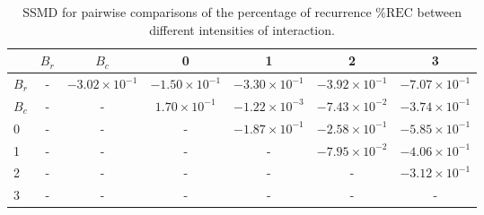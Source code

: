 \begin{table}
\centering
\caption{SSMD for pairwise comparisons of the percentage of recurrence $\%\text{REC}$ between different intensities of interaction.}
\label{tab:ssmd_rec}
\begin{tabular}{lcccccc}
\toprule
 & $B_r$ & $B_c$ & 0 & 1 & 2 & 3 \\
\midrule
$B_r$ & - & $-3.02 \times 10^{-1}$ & $-1.50 \times 10^{-1}$ & $-3.30 \times 10^{-1}$ & $-3.92 \times 10^{-1}$ & $-7.07 \times 10^{-1}$ \\
$B_c$ & - & - & $1.70 \times 10^{-1}$ & $-1.22 \times 10^{-3}$ & $-7.43 \times 10^{-2}$ & $-3.74 \times 10^{-1}$ \\
0 & - & - & - & $-1.87 \times 10^{-1}$ & $-2.58 \times 10^{-1}$ & $-5.85 \times 10^{-1}$ \\
1 & - & - & - & - & $-7.95 \times 10^{-2}$ & $-4.06 \times 10^{-1}$ \\
2 & - & - & - & - & - & $-3.12 \times 10^{-1}$ \\
3 & - & - & - & - & - & - \\
\bottomrule
\end{tabular}
\end{table}
